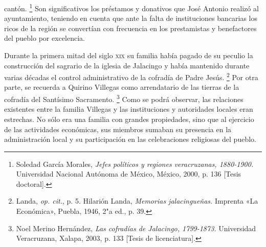 \documentclass[14pt,twoside,final]{extbook} %
\let\oldfootnote\footnote
\renewcommand\footnote[1]{%
\oldfootnote{\hspace{1mm}#1}}
\begin{document}
cantón.\footnote{Soledad García Morales, \emph{Jefes políticos y regiones veracruzanas, 1880-1900.} Universidad Nacional Autónoma de México, México, 2000, p. 136 [Tesis doctoral].} Son significativos los préstamos y donativos que José Antonio realizó al ayuntamiento, teniendo en cuenta que ante la falta de instituciones bancarias los ricos de la región se convertían con frecuencia en los prestamistas y benefactores del pueblo por excelencia.

Durante la primera mitad del siglo \textsc{xix} su familia había pagado de su peculio la construcción del sagrario de la iglesia de Jalacingo y había mantenido durante varias décadas el control administrativo de la cofradía de Padre Jesús.\footnote{Landa, \emph{op. cit.}, p. 5. Hilarión Landa, \emph{Memorias jalacingueñas.} Imprenta «La Económica», Puebla, 1946, 2"a ed., p. 39.} Por otra parte, se recuerda a Quirino Villegas como arrendatario de las tierras de la cofradía del Santísimo Sacramento.\footnote{Noel Merino Hernández, \emph{Las cofradías de Jalacingo, 1799-1873.} Universidad Veracruzana, Xalapa, 2003, p. 133 [Tesis de licenciatura].} Como se podrá observar, las relaciones existentes entre la familia Villegas y las instituciones y autoridades locales eran estrechas. No sólo era una familia con grandes propiedades, sino que al ejercicio de las actividades económicas, sus miembros sumaban su presencia en la administración local y su participación en las celebraciones religiosas del pueblo.
\end{document}
